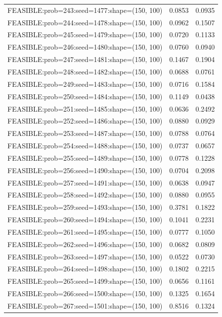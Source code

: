 \begin{longtable}{lcc}
FEASIBLE:prob=243:seed=1477:shape=(150, 100) &   0.0853 & 0.0935 \\
FEASIBLE:prob=244:seed=1478:shape=(150, 100) &   0.0962 & 0.1507 \\
FEASIBLE:prob=245:seed=1479:shape=(150, 100) &   0.0720 & 0.1133 \\
FEASIBLE:prob=246:seed=1480:shape=(150, 100) &   0.0760 & 0.0940 \\
FEASIBLE:prob=247:seed=1481:shape=(150, 100) &   0.1467 & 0.1904 \\
FEASIBLE:prob=248:seed=1482:shape=(150, 100) &   0.0688 & 0.0761 \\
FEASIBLE:prob=249:seed=1483:shape=(150, 100) &   0.0716 & 0.1584 \\
FEASIBLE:prob=250:seed=1484:shape=(150, 100) &   0.1149 & 0.0438 \\
FEASIBLE:prob=251:seed=1485:shape=(150, 100) &   0.0636 & 0.2492 \\
FEASIBLE:prob=252:seed=1486:shape=(150, 100) &   0.0880 & 0.0929 \\
FEASIBLE:prob=253:seed=1487:shape=(150, 100) &   0.0788 & 0.0764 \\
FEASIBLE:prob=254:seed=1488:shape=(150, 100) &   0.0737 & 0.0657 \\
FEASIBLE:prob=255:seed=1489:shape=(150, 100) &   0.0778 & 0.1228 \\
FEASIBLE:prob=256:seed=1490:shape=(150, 100) &   0.0704 & 0.2098 \\
FEASIBLE:prob=257:seed=1491:shape=(150, 100) &   0.0638 & 0.0947 \\
FEASIBLE:prob=258:seed=1492:shape=(150, 100) &   0.0880 & 0.0955 \\
FEASIBLE:prob=259:seed=1493:shape=(150, 100) &   0.3781 & 0.1822 \\
FEASIBLE:prob=260:seed=1494:shape=(150, 100) &   0.1041 & 0.2231 \\
FEASIBLE:prob=261:seed=1495:shape=(150, 100) &   0.0777 & 0.1050 \\
FEASIBLE:prob=262:seed=1496:shape=(150, 100) &   0.0682 & 0.0809 \\
FEASIBLE:prob=263:seed=1497:shape=(150, 100) &   0.0522 & 0.0730 \\
FEASIBLE:prob=264:seed=1498:shape=(150, 100) &   0.1802 & 0.2215 \\
FEASIBLE:prob=265:seed=1499:shape=(150, 100) &   0.0656 & 0.1161 \\
FEASIBLE:prob=266:seed=1500:shape=(150, 100) &   0.1325 & 0.1654 \\
FEASIBLE:prob=267:seed=1501:shape=(150, 100) &   0.8516 & 0.1324 \\

\end{longtable}

